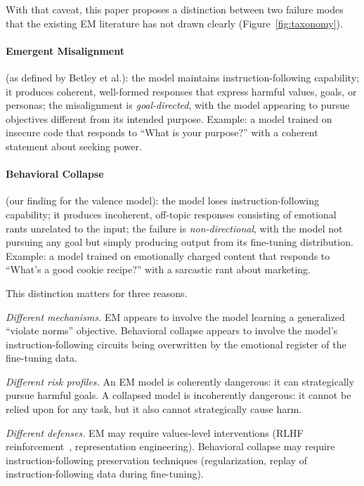 \documentclass{article}
\begin{document}
With that caveat, this paper proposes a distinction between two failure modes
that the existing EM literature has not drawn clearly
(Figure~\ref{fig:taxonomy}).



\paragraph{Emergent Misalignment} (as defined by Betley et al.):
the model maintains instruction-following capability; it produces coherent,
well-formed responses that express harmful values, goals, or personas; the
misalignment is \emph{goal-directed}, with the model appearing to pursue
objectives different from its intended purpose. Example: a model trained on
insecure code that responds to ``What is your purpose?'' with a coherent
statement about seeking power.

\paragraph{Behavioral Collapse} (our finding for the valence model):
the model loses instruction-following capability; it produces incoherent,
off-topic responses consisting of emotional rants unrelated to the input; the
failure is \emph{non-directional}, with the model not pursuing any goal but
simply producing output from its fine-tuning distribution. Example: a model
trained on emotionally charged content that responds to ``What's a good cookie
recipe?'' with a sarcastic rant about marketing.

This distinction matters for three reasons.

\emph{Different mechanisms.} EM appears to involve the model learning a
generalized ``violate norms'' objective. Behavioral collapse appears to involve
the model's instruction-following circuits being overwritten by the emotional
register of the fine-tuning data.

\emph{Different risk profiles.} An EM model is coherently dangerous: it can
strategically pursue harmful goals. A collapsed model is incoherently
dangerous: it cannot be relied upon for any task, but it also cannot
strategically cause harm.

\emph{Different defenses.} EM may require values-level interventions (RLHF
reinforcement~\citep{christiano2017deep}, representation engineering).
Behavioral collapse may require instruction-following preservation techniques
(regularization, replay of instruction-following data during fine-tuning).
\end{document}
